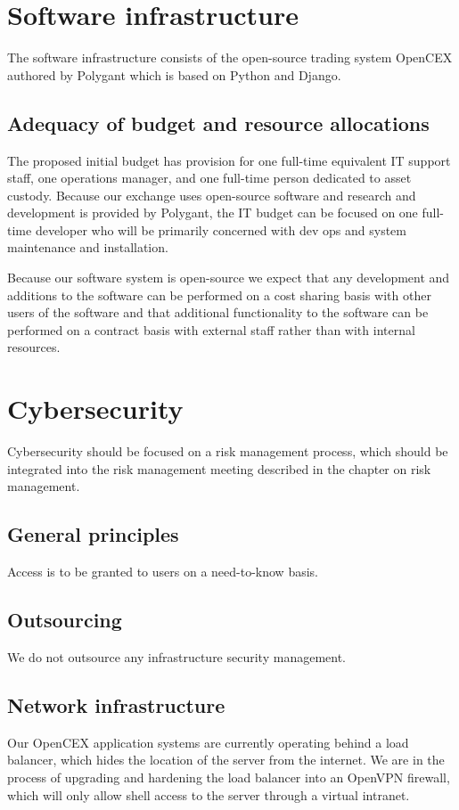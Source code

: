 \section{Software infrastructure}
The software infrastructure consists of the open-source trading system
OpenCEX authored by Polygant which is based on Python and Django.

\subsection{Adequacy of budget and resource allocations}
The proposed initial budget has provision for one full-time equivalent
IT support staff, one operations manager, and one full-time person
dedicated to asset custody.  Because our exchange uses open-source
software and research and development is provided by Polygant, the IT
budget can be focused on one full-time developer who will be primarily
concerned with dev ops and system maintenance and installation.

Because our software system is open-source we expect that any
development and additions to the software can be performed on a cost
sharing basis with other users of the software and that additional
functionality to the software can be performed on a contract basis
with external staff rather than with internal resources.

\section{Cybersecurity}
Cybersecurity should be focused on a risk management process, which
should be integrated into the risk management meeting described in the
chapter on risk management.

\subsection{General principles}
Access is to be granted to users on a need-to-know basis.

\subsection{Outsourcing}
We do not outsource any infrastructure security management.

\subsection{Network infrastructure}
Our OpenCEX application systems are currently operating behind a load balancer,
which hides the location of the server from the internet.  We are in
the process of upgrading and hardening the load balancer into an OpenVPN firewall, which will only allow shell access to the server through a virtual intranet.

